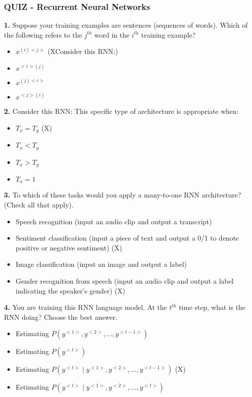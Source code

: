 \subsubsection{QUIZ - Recurrent Neural Networks}
\textbf{1.} Suppose your training examples are sentences (sequences of words). Which of the following refers to the $j^{th}$  word in the $i^{th}$ training example?
\begin{itemize}
    \item $x^{(i)<j>}$ (XConsider this RNN:)
    \item $x^{<i>(j)}$
    \item $x^{(j)<i>}$
    \item $x^{<j>(i)}$
\end{itemize}
\textbf{2.} Consider this RNN:
This specific type of architecture is appropriate when:
\begin{itemize}
    \item $T_x = T_y$ (X)
    \item $T_x < T_y$
    \item $T_x > T_y$
    \item $T_x = 1$
\end{itemize}
\textbf{3.} To which of these tasks would you apply a many-to-one RNN architecture? (Check all that apply).
\begin{itemize}
    \item Speech recognition (input an audio clip and output a transcript)
    \item Sentiment classification (input a piece of text and output a 0/1 to denote positive or negative sentiment) (X)
    \item Image classification (input an image and output a label)
    \item Gender recognition from speech (input an audio clip and output a label indicating the speaker’s gender) (X)
\end{itemize}
\textbf{4.} You are training this RNN language model.
At the $t^{th}$ time step, what is the RNN doing? Choose the best answer.
\begin{itemize}
    \item Estimating $P(y^{<1>}, y^{<2>}, ..., y^{<t-1>})$
    \item Estimating $P(y^{<t>})$
    \item Estimating $P(y^{<t>} \mid y^{<1>}, y^{<2>}, ..., y^{<t-1>})$ (X)
    \item Estimating $P(y^{<t>} \mid y^{<1>}, y^{<2>}, ..., y^{<t>})$
\end{itemize}
